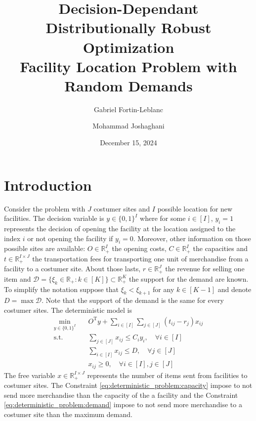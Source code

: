 \documentclass[12pt, letterpaper]{article}
\title{
	Decision-Dependant Distributionally Robust Optimization \\
	\large Facility Location Problem with Random Demands
}
\author[1]{Gabriel Fortin-Leblanc}
\author[2]{Mohammad Joshaghani}
\affil[1]{Université de Montréal}
\affil[2]{Université du Québec à Montréal}
\date{December 15, 2024}
\newcommand{\R}{\mathbb{R}}
\newcommand{\T}{\mathrm{T}}
\newcommand{\Dcal}{\mathcal{D}}
\begin{document}
	\maketitle
	\tableofcontents
	\newpage
	
	\section*{Introduction}
	
	Consider the problem with $J$ costumer sites and $I$ possible location for new facilities. The decision variable is $y \in \{0, 1\}^I$ where for some $i \in [I]$, $y_i = 1$ represents the decision of opening the facility at the location assigned to the index $i$ or not opening the facility if $y_i = 0$. Moreover, other information on those possible sites are available: $O \in \R_+^I$ the opening costs, $C \in \R_+^I$ the capacities and $t \in \R_+^{I \times J}$ the transportation fees for transporting one unit of merchandise from a facility to a costumer site. About those lasts, $r \in \R_+^J$ the revenue for selling one item and $\Dcal = \{\xi_k \in \R_+: k \in [K]\} \subset \R_+^K$ the support for the demand are known. To simplify the notation suppose that $\xi_k < \xi_{k+1}$ for any $k \in [K-1]$ and denote $D = \max \Dcal$. Note that the support of the demand is the same for every costumer sites. The deterministic model is
	\begin{subequations} \label{eq:deterministic_problem}
		\begin{align}
			\min_{y \in \{0, 1\}^I} &\quad O^\T y + \sum_{i \in [I]} \sum_{j \in [J]} (t_{ij} - r_j) x_{ij} \\
			\text{s.t.} &\quad \sum_{j \in [J]} x_{ij} \le C_i y_i, \quad \forall i \in [I] \\ \label{eq:deterministic_problem:capacity}
			&\quad \sum_{i \in [I]} x_{ij} \le D, \quad \forall j \in [J] \\ \label{eq:deterministic_problem:demand}
			&\quad x_{ij} \ge 0, \quad \forall i \in [I], j \in [J]
		\end{align}
	\end{subequations}
	The free variable $x \in \R_+^{I \times J}$ represents the number of items sent from facilities to costumer sites. The Constraint \eqref{eq:deterministic_problem:capacity} impose to not send more merchandise than the capacity of the a facility and the Constraint \eqref{eq:deterministic_problem:demand} impose to not send more merchandise to a costumer site than the maximum demand.
	
\end{document}
